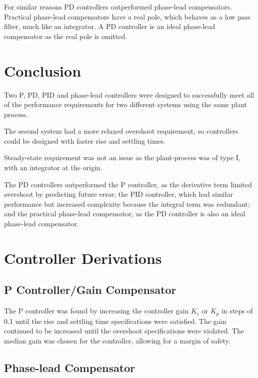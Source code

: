 \documentclass[a4paper,10pt,twocolumn]{article}
\begin{document}
For similar reasons PD controllers outperformed phase-lead compensators. Practical phase-lead compensators have a real pole, which behaves as a low pass filter, much like an integrator. A PD controller is an ideal phase-lead compensator as the real pole is omitted.

\section{Conclusion}

Two P, PD, PID and phase-lead controllers were designed to successfully meet all of the performance requirements for two different systems using the same plant process.

The second system had a more relaxed overshoot requirement, so controllers could be designed with faster rise and settling times.

Steady-state requirement was not an issue as the plant-process was of type I, with an integrator at the origin.

The PD controllers outperformed the P controller, as the derivative term limited overshoot by predicting future error; the PID controller, which had similar performance but increased complexity because the integral term was redundant; and the practical phase-lead compensator, as the PD controller is also an ideal phase-lead compensator.

\printbibliography

\appendix
\onecolumn

\section{Controller Derivations} \label{app:derive}

\subsection{P Controller/Gain Compensator}

The P controller was found by increasing the controller gain $K_c$ or $K_p$ in steps of 0.1 until the rise and settling time specifications were satisfied. The gain continued to be increased until the overshoot specifications were violated. The median gain was chosen for the controller, allowing for a margin of safety.

\subsection{Phase-lead Compensator} \label{app:lead}
\end{document}
